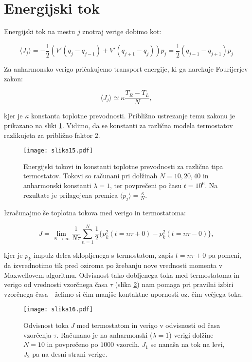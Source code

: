 \documentclass[a4paper]{article}
\newcommand{\half}{\frac{1}{2}}
\begin{document}
    \section{Energijski tok}

    Energijski tok na mestu $j$ znotraj verige dobimo kot:

    \begin{equation}\label{eq7}
        \langle J_j \rangle = -\half \left( V'(q_j - q_{j - 1}) + V'(q_{j + 1} - q_j) \right)p_j
        = \half (q_{j - 1} - q_{j + 1})p_j
    \end{equation}

    Za anharmonsko verigo pričakujemo transport energije, ki ga narekuje Fourijerjev zakon:

    \begin{equation}\label{eq8}
        \langle J_j \rangle \simeq \kappa \frac{T_R - T_L}{N},
    \end{equation}

    kjer je $\kappa$ konstanta toplotne prevodnosti.
    Približno ustrezanje temu zakonu je prikazano na sliki \ref{slika5}.
    Vidimo, da se konstanti za različna modela termostatov razlikujeta za približno faktor $2$.

    \begin{figure}
        \centering
        \texttt{[image: slika15.pdf]}
        \caption{Energijski tokovi in konstanti toplotne prevodnosti za različna tipa termostatov.
        Tokovi so računani pri dolžinah $N = 10, 20, 40$ in anharmonski konstanti $\lambda = 1$, ter povprečeni po času
        $t = 10^6$.
        Na rezultate je prilagojena premica $\langle p_j \rangle = \frac{\kappa}{N}$.}
        \label{slika5}
    \end{figure}

    Izračunajmo še toplotna tokova med verigo in termostatoma:

    \begin{equation}\label{eq9}
        J = \lim_{N \to \infty} \frac{1}{N\tau} \sum_{n = 1}^N \half \{ p_k^2(t=n\tau + 0) - p_k^2(t=n\tau - 0) \},
    \end{equation}

    kjer je $p_k$ impulz delca sklopljenega s termostatom, zapis $t = n\tau \pm 0$ pa pomeni, da izvrednotimo tik pred
    oziroma po žrebanju nove vrednosti momenta v Maxwellovem algoritmu.
    Odvisnost tako dobljenega toka med termostatoma in verigo od vrednosti vzorčnega časa $\tau$ (slika \ref{slika6}) nam
    pomaga pri pravilni izbiri vzorčnega časa - želimo si čim manjše kontaktne upornosti oz. čim večjega toka.

    \begin{figure}
        \centering
        \texttt{[image: slika16.pdf]}
        \caption{Odvisnost toka $J$ med termostatom in verigo v odvisnosti od časa vzorčenja $\tau$.
        Računano je na anharmonski ($\lambda = 1$) verigi dolžine $N = 10$ in povprečeno po $1000$ vzorcih.
        $J_1$ se nanaša na tok na levi, $J_2$ pa na desni strani verige.}
        \label{slika6}
    \end{figure}
\end{document}
